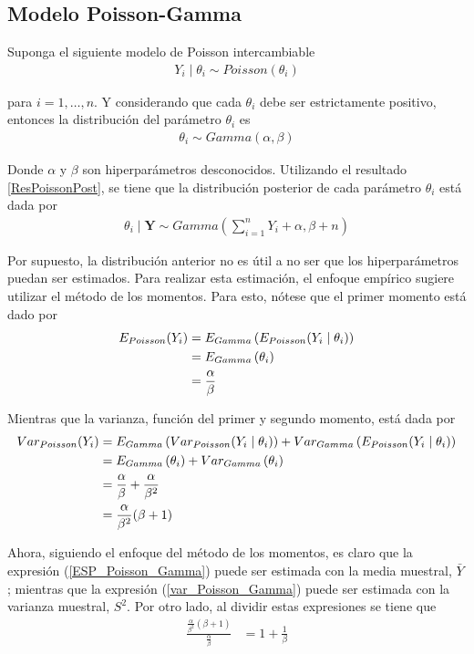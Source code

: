 \subsection{Modelo Poisson-Gamma}

Suponga el siguiente modelo de Poisson intercambiable
\begin{align*}
Y_i  \mid  \theta_i \sim Poisson(\theta_i)
\end{align*}

para $i=1,\ldots,n$. Y considerando que cada $\theta_i$ debe ser estrictamente positivo, entonces la distribución del parámetro $\theta_i$ es
\begin{align*}
\theta_i \sim Gamma(\alpha,\beta)
\end{align*}

Donde $\alpha$ y $\beta$ son hiperparámetros desconocidos. Utilizando el resultado \ref{ResPoissonPost}, se tiene que la distribución posterior de cada parámetro $\theta_i$ está dada por
\begin{align*}
\theta_i \mid \mathbf{Y} \sim Gamma\left(\sum_{i=1}^n Y_i+\alpha,\beta+n\right)
\end{align*}

Por supuesto, la distribución anterior no es útil a no ser que los hiperparámetros puedan ser estimados. Para realizar esta estimación, el enfoque empírico sugiere utilizar el método de los momentos. Para esto, nótese que el primer momento está dado por
\begin{align}\label{ESP_Poisson_Gamma}
E_{Poisson}(Y_i)&=E_{Gamma}\left(E_{Poisson}(Y_i \mid \theta_i)\right)\notag \\
&=E_{Gamma}\left(\theta_i\right) \notag \\
&=\frac{\alpha}{\beta}
\end{align}

Mientras que la varianza, función del primer y segundo momento, está dada por
\begin{align}\label{var_Poisson_Gamma}
Var_{Poisson}(Y_i)&=E_{Gamma}\left(Var_{Poisson}(Y_i \mid \theta_i)\right)+Var_{Gamma}\left(E_{Poisson}(Y_i \mid \theta_i)\right) \notag \\
&=E_{Gamma}\left(\theta_i\right)+Var_{Gamma}\left(\theta_i\right) \notag \\
&=\frac{\alpha}{\beta}+\frac{\alpha}{\beta^2} \notag \\
&=\frac{\alpha}{\beta^2}(\beta+1)
\end{align}

Ahora, siguiendo el enfoque del método de los momentos, es claro que la expresión (\ref{ESP_Poisson_Gamma}) puede ser estimada con  la media muestral, $\bar{Y}$; mientras que la expresión (\ref{var_Poisson_Gamma}) puede ser estimada con la varianza muestral, $S^2$. Por otro lado, al dividir estas expresiones se tiene que
\begin{align}
\frac{\frac{\alpha}{\beta^2}(\beta+1)}{\frac{\alpha}{\beta}}
&=1+\frac{1}{\beta}
\end{align}

